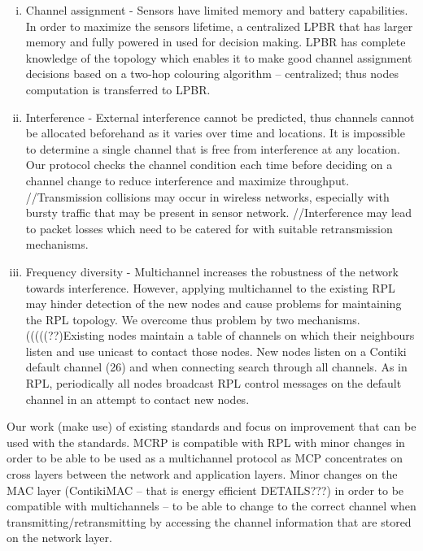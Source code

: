 \begin{enumerate}[i. ]
\item Channel assignment - Sensors have limited memory and battery capabilities. In order to maximize the sensors lifetime, a centralized LPBR that has larger memory and fully powered in used for decision making. LPBR has complete knowledge of the topology which enables it to make good channel assignment decisions based on a two-hop colouring algorithm – centralized; thus nodes computation is transferred to LPBR.

\item Interference - External interference cannot be predicted, thus channels cannot be allocated beforehand as it varies over time and locations. It is impossible to determine a single channel that is free from interference at any location. Our protocol checks the channel condition each time before deciding on a channel change to reduce interference and maximize throughput. //Transmission collisions may occur in wireless networks, especially with bursty traffic that may be present in sensor network. //Interference may lead to packet losses which need to be catered for with suitable retransmission mechanisms.

\item Frequency diversity - Multichannel increases the robustness of the network towards interference. However, applying multichannel to the existing RPL may hinder detection of the new nodes and cause problems for maintaining the RPL topology. We overcome thus problem by two mechanisms. (((((??)Existing nodes maintain a table of channels on which their neighbours listen and use unicast to contact those nodes. New nodes listen on a Contiki default channel (26) and when connecting search through all channels. As in RPL, periodically all nodes broadcast RPL control messages on the default channel in an attempt to contact new nodes.
\end{enumerate}

Our work (make use) of existing standards and focus on improvement that can be used with the standards. MCRP is compatible with RPL with minor changes in order to be able to be used as a multichannel protocol as MCP concentrates on cross layers between the network and application layers. Minor changes on the MAC layer (ContikiMAC – that is energy efficient DETAILS???) in order to be compatible with multichannels – to be able to change to the correct channel when transmitting/retransmitting by accessing the channel information that are stored on the network layer.

